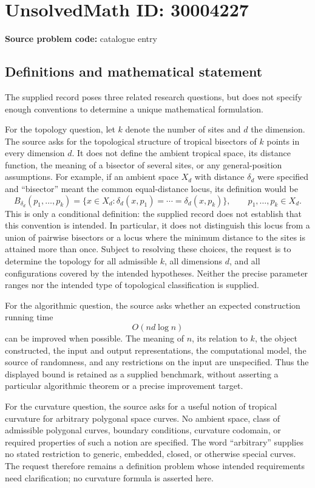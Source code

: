 \documentclass[11pt]{article}
\begin{document}
\section*{UnsolvedMath ID: 30004227}
\textbf{Source problem code:} catalogue entry
\subsection{Definitions and mathematical statement}
The supplied record poses three related research questions, but does not specify enough conventions to determine a unique mathematical formulation.

For the topology question, let \(k\) denote the number of sites and \(d\) the dimension. The source asks for the topological structure of tropical bisectors of \(k\) points in every dimension \(d\). It does not define the ambient tropical space, its distance function, the meaning of a bisector of several sites, or any general-position assumptions. For example, if an ambient space \(X_d\) with distance \(\delta_d\) were specified and ``bisector'' meant the common equal-distance locus, its definition would be
\[
 B_{\delta_d}(p_1,\ldots,p_k)
 =\{x\in X_d:\delta_d(x,p_1)=\cdots=\delta_d(x,p_k)\},
 \qquad p_1,\ldots,p_k\in X_d.
\]
This is only a conditional definition: the supplied record does not establish that this convention is intended. In particular, it does not distinguish this locus from a union of pairwise bisectors or a locus where the minimum distance to the sites is attained more than once. Subject to resolving these choices, the request is to determine the topology for all admissible \(k\), all dimensions \(d\), and all configurations covered by the intended hypotheses. Neither the precise parameter ranges nor the intended type of topological classification is supplied.

For the algorithmic question, the source asks whether an expected construction running time
\[
 O(nd\log n)
\]
can be improved when possible. The meaning of \(n\), its relation to \(k\), the object constructed, the input and output representations, the computational model, the source of randomness, and any restrictions on the input are unspecified. Thus the displayed bound is retained as a supplied benchmark, without asserting a particular algorithmic theorem or a precise improvement target.

For the curvature question, the source asks for a useful notion of tropical curvature for arbitrary polygonal space curves. No ambient space, class of admissible polygonal curves, boundary conditions, curvature codomain, or required properties of such a notion are specified. The word ``arbitrary'' supplies no stated restriction to generic, embedded, closed, or otherwise special curves. The request therefore remains a definition problem whose intended requirements need clarification; no curvature formula is asserted here.
\end{document}
